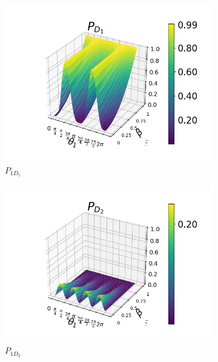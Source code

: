\documentclass[12pt]{book}
\begin{document}
\begin{figure}[t!]
\centering
\begin{subfigure}[b]{0.4\linewidth}
\includegraphics[width=\linewidth]{images/PD1_h.png}
\caption{$P_{1D_{1}}$}
\label{fig:BS1}
\end{subfigure}
\begin{subfigure}[b]{0.4\linewidth}
\includegraphics[width=\linewidth]{images/PD2_h.png}
\caption{$P_{1D_{2}}$}
\label{fig:westminster_aerea}
\end{subfigure}
\begin{subfigure}[b]{0.4\linewidth}

\end{subfigure}
\end{figure}
\end{document}
